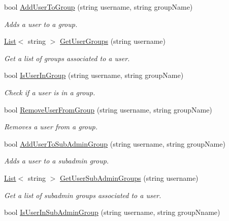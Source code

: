 \begin{DoxyCompactItemize}
bool \hyperlink{classowncloudsharp_1_1_client_a7b8657d971f2b1a9f27f2b8cfc73a21b}{Add\+User\+To\+Group} (string username, string group\+Name)
\begin{DoxyCompactList}\small\item\em Adds a user to a group. \end{DoxyCompactList}\item 
\hyperlink{classowncloudsharp_1_1_client_a914c144ebbe207958829523f7eda3609}{List}$<$ string $>$ \hyperlink{classowncloudsharp_1_1_client_a18acf90fef2b57c03effffb6f052e873}{Get\+User\+Groups} (string username)
\begin{DoxyCompactList}\small\item\em Get a list of groups associated to a user. \end{DoxyCompactList}\item 
bool \hyperlink{classowncloudsharp_1_1_client_a3ad615fa0f35fe632d80a8149c8cad74}{Is\+User\+In\+Group} (string username, string group\+Name)
\begin{DoxyCompactList}\small\item\em Check if a user is in a group. \end{DoxyCompactList}\item 
bool \hyperlink{classowncloudsharp_1_1_client_a8c2bcb8ca08d661bb4c15b8cc07eaf5d}{Remove\+User\+From\+Group} (string username, string group\+Name)
\begin{DoxyCompactList}\small\item\em Removes a user from a group. \end{DoxyCompactList}\item 
bool \hyperlink{classowncloudsharp_1_1_client_a99a393c20b57e50c10ee337b09ed75b3}{Add\+User\+To\+Sub\+Admin\+Group} (string username, string group\+Name)
\begin{DoxyCompactList}\small\item\em Adds a user to a subadmin group. \end{DoxyCompactList}\item 
\hyperlink{classowncloudsharp_1_1_client_a914c144ebbe207958829523f7eda3609}{List}$<$ string $>$ \hyperlink{classowncloudsharp_1_1_client_adc4b7d35c74b8ef9d32110c36bf57b37}{Get\+User\+Sub\+Admin\+Groups} (string username)
\begin{DoxyCompactList}\small\item\em Get a list of subadmin groups associated to a user. \end{DoxyCompactList}\item 
bool \hyperlink{classowncloudsharp_1_1_client_a62e091c3df9d3dcd40794b89de04e481}{Is\+User\+In\+Sub\+Admin\+Group} (string username, string group\+Nname)

\end{DoxyCompactItemize}
